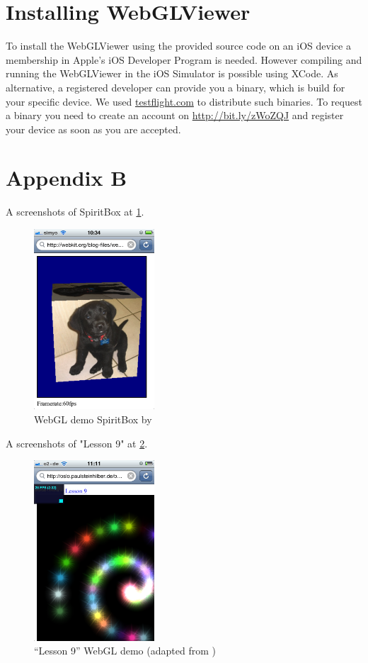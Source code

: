 \documentclass[12pt,journal,compsoc]{IEEEtran}
\begin{document}
\appendices
\section*{Installing WebGLViewer}
To install the WebGLViewer using the provided source code on an iOS device a membership in Apple's iOS Developer Program is needed. However compiling and running the WebGLViewer in the iOS Simulator is possible using XCode. As alternative, a registered developer can provide you a binary, which is build for your specific device. We used \url{testflight.com} to distribute such binaries. To request a binary you need to create an account on \url{http://bit.ly/zWoZQJ} and register your device as soon as you are accepted.

\section*{Appendix B}
A screenshots of SpiritBox at \ref{fig:spiritbox}.
\begin{figure}
	\centerline{\includegraphics[width=0.4\textwidth]{grafiken/SpiritBox}}
	\caption{WebGL demo SpiritBox by \cite{SpiritBox}}
	\label{fig:spiritbox}
\end{figure}

A screenshots of "Lesson 9" at \ref{fig:lesson9}.

\begin{figure}
	\centerline{\includegraphics[width=0.4\textwidth]{grafiken/lesson9}}
	\caption{“Lesson 9” WebGL demo (adapted from \cite{lesson9})}
	\label{fig:lesson9}
\end{figure}

\ifCLASSOPTIONcaptionsoff
  \newpage
\fi





\end{document}
